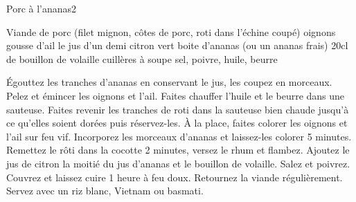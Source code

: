 \begin{recette}{Porc à l'ananas}{2}{}{}
\begin{ingredients}
\ingredient Viande de porc (filet mignon, côtes de porc, roti dans l'échine coupé)
 oignons
 gousse d'ail
\ingredient le jus d'un demi citron vert
 boite d'ananas (ou un ananas frais)
\ingredient 20cl de bouillon de volaille
 cuillères à soupe
\ingredient sel, poivre, huile, beurre
\end{ingredients}

\begin{preparation}
\etape Égouttez les tranches d’ananas en conservant le jus, les coupez en morceaux.
\etape Pelez et émincer les oignons et l’ail.
\etape Faites chauffer l’huile et le beurre dans une sauteuse. Faites revenir les tranches de roti dans la sauteuse bien chaude jusqu'à ce qu'elles soient dorées puis réservez-les.
\etape À la place, faites colorer les oignons et l’ail sur feu vif. Incorporez les morceaux d’ananas et laissez-les colorer 5 minutes.
\etape Remettez le rôti dans la cocotte 2 minutes, versez le rhum et flambez.
\etape Ajoutez le jus de citron la moitié du jus d'ananas et le bouillon de volaille. Salez et poivrez.
\etape Couvrez et laissez cuire 1 heure à feu doux. Retournez la viande régulièrement.
\etape Servez avec un riz blanc, Vietnam ou basmati.
\end{preparation}

\end{recette}


